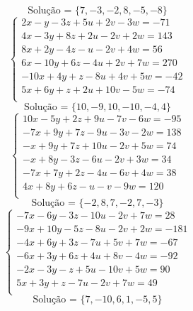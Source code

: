\documentclass[12pt,oneside,a4paper]{article}
\begin{document}
\begin{equation*}
\text{Solução = }\{7,-3,-2,8,-5,-8\}
\end{equation*}
\vspace{\baselineskip}
\begin{equation*}
\begin{cases}
2x-y-3z+5u+2v-3w=-71 \\
4x-3y+8z+2u-2v+2w=143 \\
8x+2y-4z-u-2v+4w=56 \\
6x-10y+6z-4u+2v+7w=270 \\
-10x+4y+z-8u+4v+5w=-42 \\
5x+6y+z+2u+10v-5w=-74 \\
\end{cases}
\end{equation*}
\begin{equation*}
\text{Solução = }\{10,-9,10,-10,-4,4\}
\end{equation*}
\vspace{\baselineskip}
\begin{equation*}
\begin{cases}
10x-5y+2z+9u-7v-6w=-95 \\
-7x+9y+7z-9u-3v-2w=138 \\
-x+9y+7z+10u-2v+5w=74 \\
-x+8y-3z-6u-2v+3w=34 \\
-7x+7y+2z-4u-6v+4w=38 \\
4x+8y+6z-u-v-9w=120 \\
\end{cases}
\end{equation*}
\begin{equation*}
\text{Solução = }\{-2,8,7,-2,7,-3\}
\end{equation*}
\vspace{\baselineskip}
\begin{equation*}
\begin{cases}
-7x-6y-3z-10u-2v+7w=28 \\
-9x+10y-5z-8u-2v+2w=-181 \\
-4x+6y+3z-7u+5v+7w=-67 \\
-6x+3y+6z+4u+8v-4w=-92 \\
-2x-3y-z+5u-10v+5w=90 \\
5x+3y+z-7u-2v+7w=49 \\
\end{cases}
\end{equation*}
\begin{equation*}
\text{Solução = }\{7,-10,6,1,-5,5\}
\end{equation*}
\end{document}
